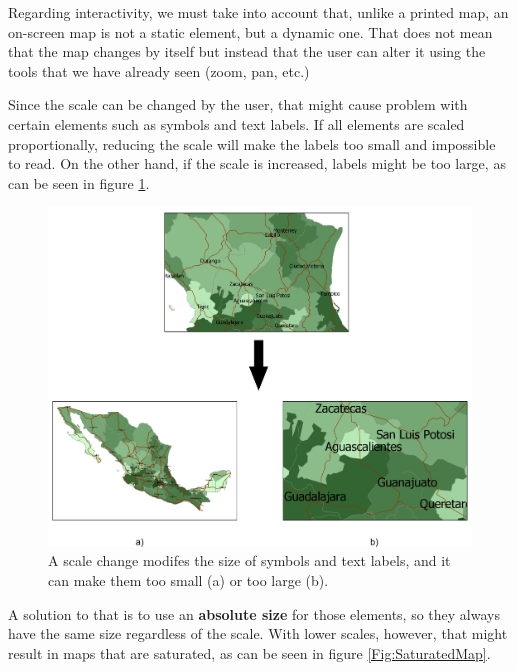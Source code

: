 Regarding interactivity, we must take into account that, unlike a printed map, an on-screen map is not a static element, but a dynamic one. That does not mean that the map changes by itself but instead that the user can alter it using the tools that we have already seen (zoom, pan, etc.)

Since the scale can be changed by the user, that might cause problem with certain elements such as symbols and text labels. If all elements are scaled proportionally, reducing the scale will make the labels too small and impossible to read. On the other hand, if the scale is increased, labels might be too large, as can be seen in figure \ref{Fig:ProblemsChangeScale}. 


\begin{figure}[!hbt]
\centering
\includegraphics[width=\columnwidth]{Visualization/ProblemsChangeScale.pdf}
\caption{\small  A scale change modifes the size of symbols and text labels, and it can make them too small (a) or too large (b).}
\label{Fig:ProblemsChangeScale} 
\end{figure}

A solution to that is to use an \textbf{absolute size} for those elements, so they always have the same size regardless of the scale. With lower scales, however, that might result in maps that are saturated, as can be seen in figure \ref{Fig:SaturatedMap}.

